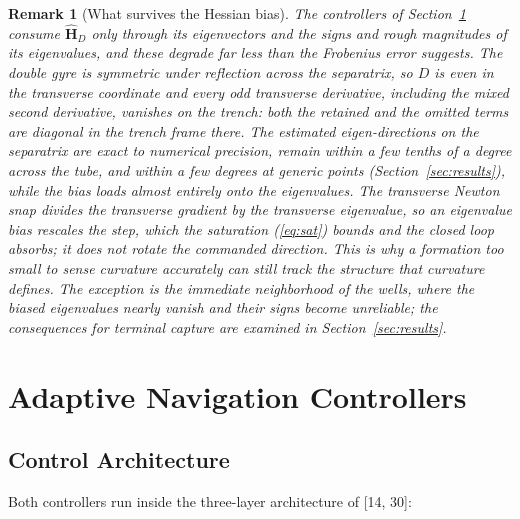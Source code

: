 \documentclass[lettersize,journal]{IEEEtran}
\newtheorem{remark}{Remark}
\begin{document}
\begin{remark}[What survives the Hessian bias]
\label{rem:eigvec}
The controllers of Section~\ref{sec:controllers} consume
$\hat{\mathbf{H}}_D$ only through its eigenvectors and the signs and
rough magnitudes of its eigenvalues, and these degrade far less than the
Frobenius error suggests. The double gyre is symmetric under reflection
across the separatrix, so $D$ is even in the transverse coordinate and
every odd transverse derivative, including the mixed second derivative,
vanishes on the trench: both the retained and the omitted terms are
diagonal in the trench frame there. The estimated eigen-directions on
the separatrix are exact to numerical precision, remain within a few
tenths of a degree across the tube, and within a few degrees at generic
points (Section~\ref{sec:results}), while the bias loads almost entirely
onto the eigenvalues. The transverse Newton snap divides the transverse
gradient by the transverse eigenvalue, so an eigenvalue bias rescales
the step, which the saturation (\ref{eq:sat}) bounds and the closed loop
absorbs; it does not rotate the commanded direction. This is why a
formation too small to sense curvature accurately can still track the
structure that curvature defines. The exception is the immediate
neighborhood of the wells, where the biased eigenvalues nearly vanish
and their signs become unreliable; the consequences for terminal capture
are examined in Section~\ref{sec:results}.
\end{remark}


\section{Adaptive Navigation Controllers}
\label{sec:controllers}

\subsection{Control Architecture}
\label{sec:arch}

Both controllers run inside the three-layer architecture of [14, 30]:
\end{document}
